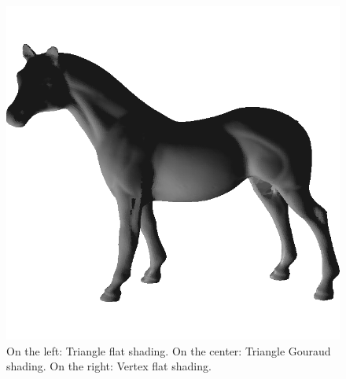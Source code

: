 \begin{figure}[!h]
    \endminipage\hfill
    \centering
    \includegraphics[scale=0.39]{images/horse-efs.png}
    \endminipage\hfill
    \caption{On the left: Triangle flat shading. On the center: Triangle Gouraud shading. On the right: Vertex flat shading.}
    \label{fig:comparison-gc-gci}
\end{figure}

